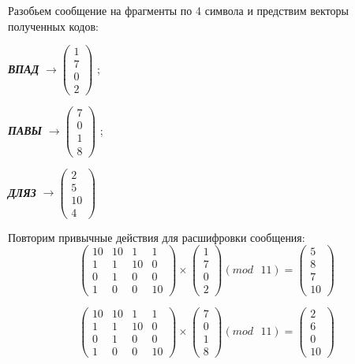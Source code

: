 \documentclass[a5paper, 10pt]{article}
\theoremstyle{definition}
\theoremstyle{plain}
\theoremstyle{remark}
\begin{document}
Разобьем сообщение на фрагменты по 4 символа и предствим векторы полученных кодов:
\begin{center}
\textbf{\textit{ВПАД}} $\to \begin{pmatrix}
1\\
7\\
0\\
2
\end{pmatrix}$ ;

\textbf{\textit{ПАВЫ}}  $\to \begin{pmatrix}
7\\
0\\
1\\
8
\end{pmatrix}$ ;

\textbf{\textit{ДЛЯЗ}}  $\to \begin{pmatrix}
2\\
5\\
10\\
4
\end{pmatrix}$ \\
\end{center}

Повторим привычные действия для расшифровки сообщения:
\begin{equation}
\begin{pmatrix}
10 & 10 & 1 & 1\\
1 & 1 & 10 & 0 \\
0 & 1 & 0 & 0 \\
1 & 0 & 0 & 10
\end{pmatrix}
 \times
\begin{pmatrix}
1\\
7\\
0\\
2
\end{pmatrix}
(mod \text{ }11)
= \begin{pmatrix}
5\\
8\\
7\\
10
\end{pmatrix}
\end{equation}

\begin{equation}
\begin{pmatrix}
10 & 10 & 1 & 1\\
1 & 1 & 10 & 0 \\
0 & 1 & 0 & 0 \\
1 & 0 & 0 & 10
\end{pmatrix}
 \times
\begin{pmatrix}
7\\
0\\
1\\
8
\end{pmatrix}
(mod \text{ }11)
= \begin{pmatrix}
2\\
6\\
0\\
10
\end{pmatrix}
\end{equation}
\end{document}
